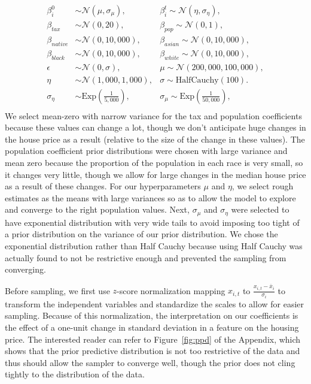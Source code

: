 \documentclass[11pt]{amsart}
\begin{document}
\begin{align*}
    \beta_i^0 & \sim \mathscr{N}(\mu, \sigma_{\mu}), 
    &\beta_i^t  \sim \mathscr N(\eta, \sigma_{\eta}), \\
    \beta_{tax} & \sim \mathscr N (0, 20), 
    &\beta_{pop}  \sim \mathscr N (0, 1), \\
    \beta_{native} & \sim \mathscr N (0, 10{,}000), 
    &\beta_{asian}  \sim \mathscr N (0, 10{,}000), \\
    \beta_{black} & \sim \mathscr N (0, 10{,}000), 
    &\beta_{white}  \sim \mathscr N (0, 10{,}000), \\
    \epsilon & \sim \mathscr N(0, \sigma), 
    &\mu \sim \mathscr N(200{,}000, 100{,}000), \\
    \eta &\sim \mathscr N(1{,}000, 1{,}000), 
    &\sigma \sim \text{HalfCauchy}(100). \\
    \sigma_{\eta} &\sim \text{Exp} \left(\frac{1}{5{,}000}\right), 
    &\sigma_{\mu} \sim \text{Exp}\left(\frac{1}{50{,}000}\right), \\
\end{align*}
We select mean-zero with narrow variance for the tax and population coefficients because these values can change a lot, though we don't anticipate huge changes in the house price as a result (relative to the size of the change in these values).
The population coefficient prior distributions were chosen with large variance and mean zero because the proportion of the population in each race is very small, so it changes very little, though we allow for large changes in the median house price as a result of these changes.
For our hyperparameters $\mu$ and $\eta$, we select rough estimates as the means with large variances so as to allow the model to explore and converge to the right population values.
Next, $\sigma_{\mu}$ and $\sigma_{\eta}$ were selected to have exponential distribution with very wide tails to avoid imposing too tight of a prior distribution on the variance of our prior distribution.
We chose the exponential distribution rather than Half Cauchy because using Half Cauchy was actually found to not be restrictive enough and prevented the sampling from converging.

Before sampling, we first use $z$-score normalization mapping $x_{i, t}$ to $\frac{x_{i, t} - \overline{x}_i}{\sigma_i}$ to transform the independent variables and standardize the scales to allow for easier sampling.
Because of this normalization, the interpretation on our coefficients is the effect of a one-unit change in standard deviation in a feature on the housing price.
The interested reader can refer to Figure~\ref{fig:ppd} of the Appendix, which shows that the prior predictive distribution is not too restrictive of the data and thus should allow the sampler to converge well, though the prior does not cling tightly to the distribution of the data.
\end{document}
